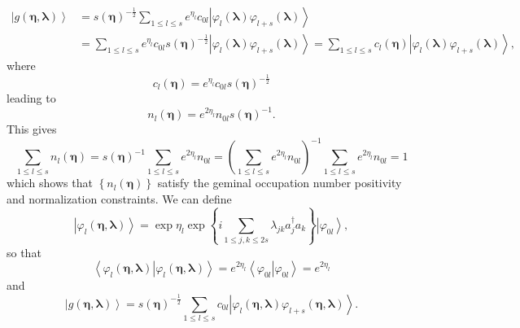\documentclass[aps,preprint]{revtex4}%
\begin{document}
\begin{align}
\left\vert g\left(  \mathbf{\eta},\mathbf{\lambda}\right)  \right\rangle  &
=\mathit{s}\left(  \mathbf{\eta}\right)  ^{-\frac{1}{2}}\sum_{1\leq l\leq
s}e^{\eta_{l}}c_{0l}\left\vert \varphi_{l}\left(  \mathbf{\lambda}\right)
\varphi_{l+s}\left(  \mathbf{\lambda}\right)  \right\rangle \nonumber\\
&  =\sum_{1\leq l\leq s}e^{\eta_{l}}c_{0l}\mathit{s}\left(  \mathbf{\eta
}\right)  ^{-\frac{1}{2}}\left\vert \varphi_{l}\left(  \mathbf{\lambda
}\right)  \varphi_{l+s}\left(  \mathbf{\lambda}\right)  \right\rangle
=\sum_{1\leq l\leq s}c_{l}\left(  \mathbf{\eta}\right)  \left\vert \varphi
_{l}\left(  \mathbf{\lambda}\right)  \varphi_{l+s}\left(  \mathbf{\lambda
}\right)  \right\rangle ,
\end{align}
where
\begin{equation}
c_{l}\left(  \mathbf{\eta}\right)  =e^{\eta_{l}}c_{0l}\mathit{s}\left(
\mathbf{\eta}\right)  ^{-\frac{1}{2}}%
\end{equation}
leading to
\begin{equation}
n_{l}\left(  \mathbf{\eta}\right)  =e^{2\eta_{l}}n_{0l}\mathit{s}\left(
\mathbf{\eta}\right)  ^{-1}.
\end{equation}
This gives
\begin{equation}
\sum_{1\leq l\leq s}n_{l}\left(  \mathbf{\eta}\right)  =\mathit{s}\left(
\mathbf{\eta}\right)  ^{-1}\sum_{1\leq l\leq s}e^{2\eta_{l}}n_{0l}=\left(
\sum_{1\leq l\leq s}e^{2\eta_{l}}n_{0l}\right)  ^{-1}\sum_{1\leq l\leq
s}e^{2\eta_{l}}n_{0l}=1
\end{equation}
which shows that $\left\{  n_{l}\left(  \mathbf{\eta}\right)  \right\}  $
satisfy the geminal occupation number positivity and normalization
constraints. We can define%
\begin{equation}
\left\vert \varphi_{l}\left(  \mathbf{\eta,\lambda}\right)  \right\rangle
=\exp\eta_{l}\exp\left\{  i\sum_{1\leq j,k\leq2s}\lambda_{jk}a_{j}^{\dagger
}a_{k}\right\}  \left\vert \varphi_{0l}\right\rangle ,
\end{equation}
so that
\begin{equation}
\left\langle \left.  \varphi_{l}\left(  \mathbf{\eta,\lambda}\right)
\right\vert \varphi_{l}\left(  \mathbf{\eta,\lambda}\right)  \right\rangle
=e^{2\eta_{l}}\left\langle \left.  \varphi_{0l}\right\vert \varphi
_{0l}\right\rangle =e^{2\eta_{l}}%
\end{equation}
and
\begin{equation}
\left\vert g\left(  \mathbf{\eta},\mathbf{\lambda}\right)  \right\rangle
=\mathit{s}\left(  \mathbf{\eta}\right)  ^{-\frac{1}{2}}\sum_{1\leq l\leq
s}c_{0l}\left\vert \varphi_{l}\left(  \mathbf{\eta,\lambda}\right)
\varphi_{l+s}\left(  \mathbf{\eta,\lambda}\right)  \right\rangle .
\end{equation}
\end{document}
